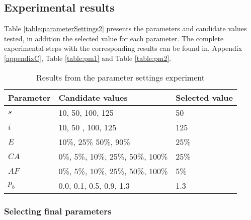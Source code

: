 


\subsection{Experimental results}
\label{subsec:parameterSettings_results}

Table \vref{table:parameterSettings2} presents the parameters and candidate values tested, in addition the selected value for each parameter. The complete experimental steps with the corresponding results can be found in, Appendix \ref{appendixC}, Table \vref{table:pm1} and Table \vref{table:pm2}. 

    \begin{table}[H]
    \centering
    \begin{tabular}{|l|l||l|}
    \hline
    \textbf{Parameter} & \textbf{Candidate values} & \textbf{Selected value}\\
    \hline
    $s$ & 10, 50, 100, 125 & 50 \\
    $i$ & 10, 50 , 100, 125 & 125\\
    $E$ & 10\%, 25\% 50\%, 90\% & 25\% \\
    $CA$ & 0\%, 5\%, 10\%, 25\%, 50\%, 100\% & 25\% \\
    $AF$ & 0\%, 5\%, 10\%, 25\%, 50\%, 100\% & 5\% \\
    $p_{b}$ & 0.0, 0.1, 0.5, 0.9, 1.3 & 1.3 \\
    \hline
    \end{tabular}
    \caption {Results from the parameter settings experiment}
    \label{table:parameterSettings2}
    \end{table}
    
\subsubsection*{Selecting final parameters}

